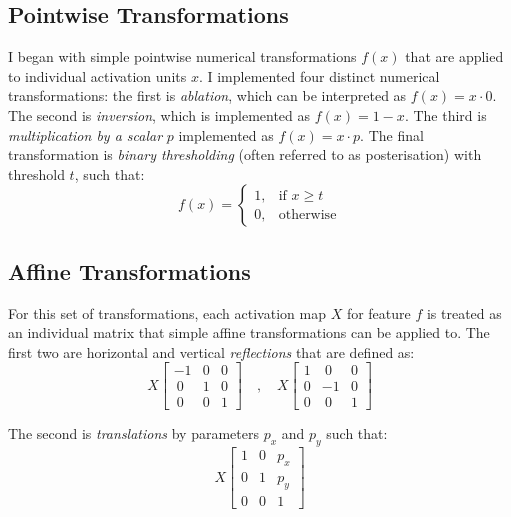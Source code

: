 \subsection{Pointwise Transformations}

I began with simple pointwise numerical transformations $f(x)$ that are applied to individual activation units $x$. 
I implemented four distinct numerical transformations: the first is \emph{ablation}, which can be interpreted as $f(x) = x \cdot 0$. 
The second is \emph{inversion}, which is implemented as $f(x) = 1 - x$. 
The third is \emph{multiplication by a scalar} $p$ implemented as $f(x) = x \cdot p$. 
The final transformation is \emph{binary thresholding} (often referred to  as posterisation) with threshold $t$, such that:
\begin{equation}
f(x) = \begin{cases}
    1,& \text{if } x\geq t\\
    0,              & \text{otherwise}
\end{cases}
\end{equation}

\subsection{Affine Transformations}
\label{sec:affine}
For this set of transformations, each activation map $X$ for feature $f$ is treated as an individual matrix that simple affine transformations can be applied to. 
The first two are horizontal and vertical \emph{reflections} that are defined as:
\begin{equation}
X \begin{bmatrix}
-1 & 0 & 0\\
\ 0 & 1 & 0\\
\ 0 & 0 & 1
\end{bmatrix}\quad , \quad X \begin{bmatrix}
1 & \ 0 & 0\\
0 & -1 & 0\\
0 & \ 0 & 1
\end{bmatrix}
\end{equation}

\noindent The second is \emph{translations} by parameters $p_x$ and $p_y$ such that:
\begin{equation}
X \begin{bmatrix}
1 & 0 & p_x\\
0 & 1 & p_y\\
0 & 0 & 1
\end{bmatrix}
\end{equation}

